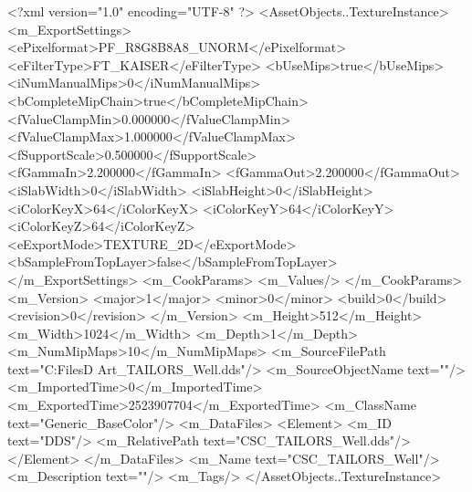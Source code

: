 <?xml version="1.0" encoding="UTF-8" ?>
<AssetObjects..TextureInstance>
	<m_ExportSettings>
		<ePixelformat>PF_R8G8B8A8_UNORM</ePixelformat>
		<eFilterType>FT_KAISER</eFilterType>
		<bUseMips>true</bUseMips>
		<iNumManualMips>0</iNumManualMips>
		<bCompleteMipChain>true</bCompleteMipChain>
		<fValueClampMin>0.000000</fValueClampMin>
		<fValueClampMax>1.000000</fValueClampMax>
		<fSupportScale>0.500000</fSupportScale>
		<fGammaIn>2.200000</fGammaIn>
		<fGammaOut>2.200000</fGammaOut>
		<iSlabWidth>0</iSlabWidth>
		<iSlabHeight>0</iSlabHeight>
		<iColorKeyX>64</iColorKeyX>
		<iColorKeyY>64</iColorKeyY>
		<iColorKeyZ>64</iColorKeyZ>
		<eExportMode>TEXTURE_2D</eExportMode>
		<bSampleFromTopLayer>false</bSampleFromTopLayer>
	</m_ExportSettings>
	<m_CookParams>
		<m_Values/>
	</m_CookParams>
	<m_Version>
		<major>1</major>
		<minor>0</minor>
		<build>0</build>
		<revision>0</revision>
	</m_Version>
	<m_Height>512</m_Height>
	<m_Width>1024</m_Width>
	<m_Depth>1</m_Depth>
	<m_NumMipMaps>10</m_NumMipMaps>
	<m_SourceFilePath text="C:\Users\Shadow\Desktop\Working Files\3D Art\Quarters\CSC_TAILORS_Well.dds"/>
	<m_SourceObjectName text=""/>
	<m_ImportedTime>0</m_ImportedTime>
	<m_ExportedTime>2523907704</m_ExportedTime>
	<m_ClassName text="Generic_BaseColor"/>
	<m_DataFiles>
		<Element>
			<m_ID text="DDS"/>
			<m_RelativePath text="CSC_TAILORS_Well.dds"/>
		</Element>
	</m_DataFiles>
	<m_Name text="CSC_TAILORS_Well"/>
	<m_Description text=""/>
	<m_Tags/>
</AssetObjects..TextureInstance>

